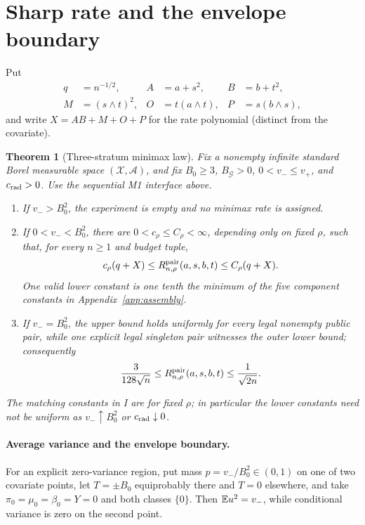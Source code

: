 \documentclass{article}
\newtheorem{theorem}{Theorem}
\theoremstyle{definition}
\theoremstyle{remark}
\begin{document}
\section{Sharp rate and the envelope boundary}
\label{sec:theorem}
Put
\begin{align}
 q&=n^{-1/2},& A&=a+s^2,& B&=b+t^2,\nonumber\\
 M&=(s\wedge t)^2,& O&=t(a\wedge t),& P&=s(b\wedge s),
 \label{eq:terms}
\end{align}
and write \(X=AB+M+O+P\) for the rate polynomial (distinct from the covariate).
\begin{theorem}[Three-stratum minimax law]
\label{thm:main}
Fix a nonempty infinite standard Borel measurable space
\((\mathcal X,\mathcal A)\), and fix \(B_0\ge3\), \(B_{\mathcal G}>0\),
\(0<v_-\le v_+\), and \(c_{\rm rad}>0\).  Use the sequential M1 interface above.
\begin{enumerate}
\item[\textnormal{E.}] If \(v_->B_0^2\), the experiment is empty and no minimax rate is assigned.
\item[\textnormal{I.}] If \(0<v_-<B_0^2\), there are \(0<c_\rho\le C_\rho<\infty\), depending only on fixed \(\rho\), such that, for every \(n\ge1\) and budget tuple,
\begin{equation}
c_\rho(q+X)\le R^{\mathrm{pair}}_{n,\rho}(a,s,b,t)\le C_\rho(q+X).
\label{eq:mainrate}
\end{equation}
One valid lower constant is one tenth the minimum of the five component constants in Appendix~\ref{app:assembly}.
\item[\textnormal{S.}] If \(v_-=B_0^2\), the upper bound holds uniformly for every legal nonempty public pair, while one explicit legal singleton pair witnesses the outer lower bound; consequently
\begin{equation}
\frac{3}{128\sqrt n}\le R^{\mathrm{pair}}_{n,\rho}(a,s,b,t)\le\frac1{\sqrt{2n}}.
\label{eq:saturation}
\end{equation}
\end{enumerate}
The matching constants in I are for fixed \(\rho\); in particular the lower constants need not be uniform as \(v_-\uparrow B_0^2\) or \(c_{\rm rad}\downarrow0\).
\end{theorem}

\paragraph{Average variance and the envelope boundary.}
\label{sec:boundary}
For an explicit zero-variance region, put mass \(p=v_-/B_0^2\in(0,1)\) on one of two covariate points, let \(T=\pm B_0\) equiprobably there and \(T=0\) elsewhere, and take \(\pi_0=\mu_0=\beta_0=Y=0\) and both classes \(\{0\}\). Then \(\mathbb E u^2=v_-\), while conditional variance is zero on the second point.
\end{document}
